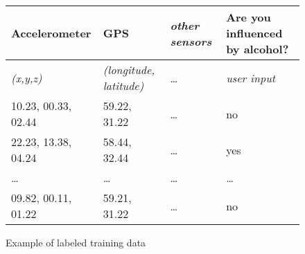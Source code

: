 \begin{figure}[]
\centering
\begin{tabular}{|l|l|l|l|} 
\hline
Accelerometer       & GPS           & \emph{other sensors} & Are you influenced by alcohol? \\ \hline
\emph{(x,y,z)}       & \emph{(longitude, latitude)}           & \ldots & \emph{user input} \\ \hline
10.23, 00.33, 02.44 & 59.22, 31.22  & \ldots & no                             \\ \hline
22.23, 13.38, 04.24 & 58.44, 32.44  & \ldots & yes                            \\ \hline
\ldots              & \ldots        & \ldots & \ldots                         \\ \hline
09.82, 00.11, 01.22 & 59.21, 31.22  & \ldots & no                             \\ \hline
\end{tabular}
\caption{Example of labeled training data}
\label{fig:labeled_training_data}
\end{figure}

